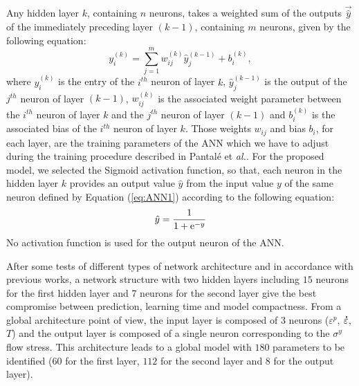 \documentclass[twoside,english,1p,final,sort&compress]{elsarticle}
\makeatletter
\theoremstyle{plain}
\DeclareRobustCommand{\e}[1]{{\rm e}^{#1}}
\DeclareRobustCommand{\lay}[1]{^{(#1)}}
\DeclareRobustCommand{\mdot}[1]{\accentset{\mbox{\bfseries .}}{#1}}
\DeclareRobustCommand{\eal}{et \emph{al.}\@\xspace}
\makeatother
\begin{document}
Any hidden layer $k$, containing $n$ neurons, takes a weighted sum of the outputs $\overrightarrow{\hat{y}}$ of the immediately preceding layer $(k-1)$, containing $m$ neurons, given by the following equation:
\begin{equation}
y_i\lay{k} = \sum_{j=1}^m w_{ij}\lay{k} \hat{y}_j^{(k-1)}+ b_i\lay{k},\label{eq:ANN1}
\end{equation}
where $y_i\lay{k}$ is the entry of the $i^{th}$ neuron of layer $k$, $\hat{y}_j\lay{k-1}$ is the output of the $j^{th}$ neuron of layer $(k-1)$, $w_{ij}\lay{k}$ is the associated weight parameter between the $i^{th}$ neuron of layer $k$ and the $j^{th}$ neuron of layer $(k-1)$ and $b_i\lay{k}$ is the associated bias of the $i^{th}$ neuron of layer $k$.
Those weights $w_{ij}$ and bias $b_i$, for each layer, are the training parameters of the ANN which we have to adjust during the training procedure described in Pantalé \eal \cite{Pantale-2021}.
For the proposed model, we selected the Sigmoid activation function, so that, each neuron in the hidden layer $k$ provides an output value ${\hat{y}}$ from the input value $y$ of the same neuron defined by Equation (\ref{eq:ANN1}) according to the following equation:
\begin{equation}
\hat{y}=\frac{1}{1 + \e{-y}}\label{eq:ANN2}
\end{equation}
No activation function is used for the output neuron of the ANN.

After some tests of different types of network architecture and in accordance with previous works, a network structure with two hidden layers including $15$ neurons for the first hidden layer and 7 neurons for the second layer give the best compromise between prediction, learning time and model compactness.
From a global architecture point of view, the input layer is composed of $3$ neurons ($\varepsilon^p$, $\mdot\varepsilon$, $T$) and the output layer is composed of a single neuron corresponding to the $\sigma^y$ flow stress.
This architecture leads to a global model with $180$ parameters to be identified ($60$ for the first layer, $112$ for the second layer and 8 for the output layer).
\end{document}
